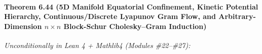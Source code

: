\documentclass[
  11pt,
]{article}
\begin{document}
\paragraph{\texorpdfstring{Theorem 6.44 (5D Manifold Equatorial
Confinement, Kinetic Potential Hierarchy, Continuous/Discrete Lyapunov
Gram Flow, and Arbitrary-Dimension \(n \times n\) Block-Schur
Cholesky--Gram
Induction)}{Theorem 6.44 (5D Manifold Equatorial Confinement, Kinetic Potential Hierarchy, Continuous/Discrete Lyapunov Gram Flow, and Arbitrary-Dimension n \textbackslash times n Block-Schur Cholesky--Gram Induction)}}\label{theorem-6.44-5d-manifold-equatorial-confinement-kinetic-potential-hierarchy-continuousdiscrete-lyapunov-gram-flow-and-arbitrary-dimension-n-times-n-block-schur-choleskygram-induction}

\emph{Unconditionally in Lean 4 + Mathlib4 (Modules \#22--\#27):}
\end{document}
